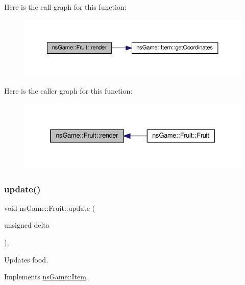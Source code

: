 Here is the call graph for this function\+:\nopagebreak
\begin{figure}[H]
\begin{center}
\leavevmode
\includegraphics[width=350pt]{classns_game_1_1_fruit_a99622754f8cf90bb285b4808e98372c7_cgraph}
\end{center}
\end{figure}
Here is the caller graph for this function\+:\nopagebreak
\begin{figure}[H]
\begin{center}
\leavevmode
\includegraphics[width=332pt]{classns_game_1_1_fruit_a99622754f8cf90bb285b4808e98372c7_icgraph}
\end{center}
\end{figure}
\mbox{\label{classns_game_1_1_fruit_adade5568e2f552576d0d32b714b9ac02}} 
\subsubsection{\texorpdfstring{update()}{update()}}
{\footnotesize\ttfamily void ns\+Game\+::\+Fruit\+::update (\begin{DoxyParamCaption}\item[{unsigned}]{delta }\end{DoxyParamCaption})\hspace{0.3cm}{\ttfamily [override]}, {\ttfamily [virtual]}}



Updates food. 



Implements \hyperlink{structns_game_1_1_item_a96c07d0f91eef0d77e91d1a7397091a1}{ns\+Game\+::\+Item}.



